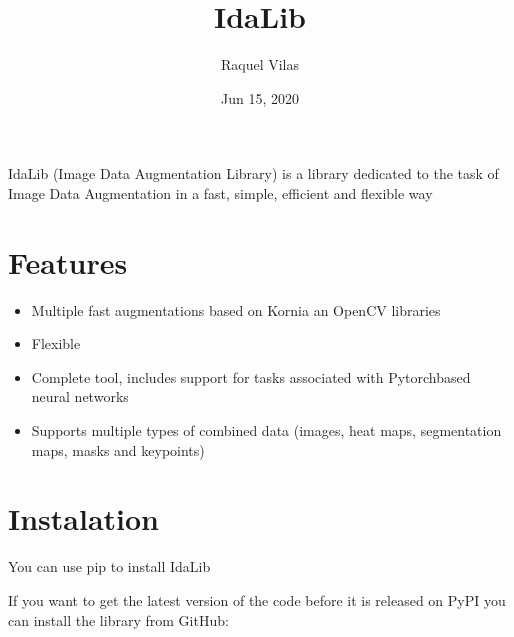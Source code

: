 \documentclass[letterpaper,10pt,english]{sphinxmanual}
\title{IdaLib}
\date{Jun 15, 2020}
\author{Raquel Vilas}
\begin{document}
\pagestyle{empty}
\sphinxmaketitle
\pagestyle{plain}
\sphinxtableofcontents
\pagestyle{normal}
\label{\detokenize{index::doc}}



IdaLib (Image Data Augmentation Library) is a library dedicated to the task of Image Data Augmentation in a fast, simple, efficient and flexible way


\chapter{Features}
\label{\detokenize{index:features}}\begin{itemize}
\item {} 
Multiple fast augmentations based on Kornia an OpenCV libraries

\item {} 
Flexible

\item {} 
Complete tool, includes support for tasks associated with Pytorch\sphinxhyphen{}based neural networks

\item {} 
Supports multiple types of combined data (images, heat maps, segmentation maps, masks and keypoints)

\end{itemize}


\chapter{Instalation}
\label{\detokenize{index:instalation}}
You can use pip to install Ida\sphinxhyphen{}Lib

\begin{sphinxVerbatim}[commandchars=\\\{\}]
  
\end{sphinxVerbatim}

If you want to get the latest version of the code before it is released on PyPI you can install the library from GitHub:

\begin{sphinxVerbatim}[commandchars=\\\{\}]
   
\end{sphinxVerbatim}
\end{document}
